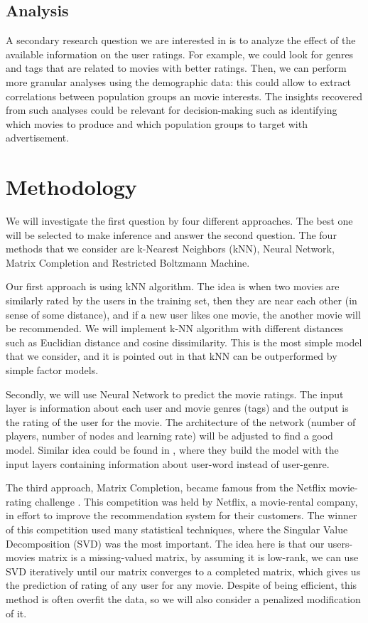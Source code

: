 \documentclass[bj, preprint]{imsart}
\begin{document}
\subsection{Analysis}

A secondary research question we are interested in is to analyze the effect of the available information on the user ratings. For example, we could look for genres and tags that are related to movies with better ratings. Then, we can perform more granular analyses using the demographic data: this could allow to extract correlations between population groups an movie interests. The insights recovered from such analyses could be relevant for decision-making such as identifying which movies to produce and which population groups to target with advertisement.

\section{Methodology}\label{sec:setting}
We will investigate the first question by four different approaches. The best one will be selected to make inference and answer the second question. The four methods that we consider are k-Nearest Neighbors (kNN), Neural Network, Matrix Completion and Restricted Boltzmann Machine. 

Our first approach is using kNN algorithm. The idea is when two movies are similarly rated by the users in the training set, then they are near each other (in sense of some distance), and if a new user likes one movie, the another movie will be recommended. We will implement k-NN algorithm with different distances such as Euclidian distance and cosine dissimilarity. This is the most simple model that we consider, and it is pointed out in \cite{toscher2009bigchaos} that kNN can be outperformed by simple factor models.

Secondly, we will use Neural Network to predict the movie ratings. The input layer is information about each user and movie genres (tags) and the output is the rating of the user for the movie. The architecture of the network (number of players, number of nodes and learning rate) will be adjusted to find a good model. Similar idea could be found in \cite{tang2015user}, where they build the model with the input layers containing information about user-word instead of user-genre. 

The third approach, Matrix Completion, became famous from the Netflix movie-rating challenge \cite{bennett2007netflix}. This competition was held by Netflix, a movie-rental company, in effort to improve the recommendation system for their customers. The winner of this competition used many statistical techniques, where the Singular Value Decomposition (SVD) was the most important. The idea here is that our users-movies matrix is a missing-valued matrix, by assuming it is low-rank, we can use SVD iteratively until our matrix converges to a completed matrix, which gives us the prediction of rating of any user for any movie. Despite of being efficient, this method is often overfit the data, so we will also consider a penalized modification of it.
\end{document}
